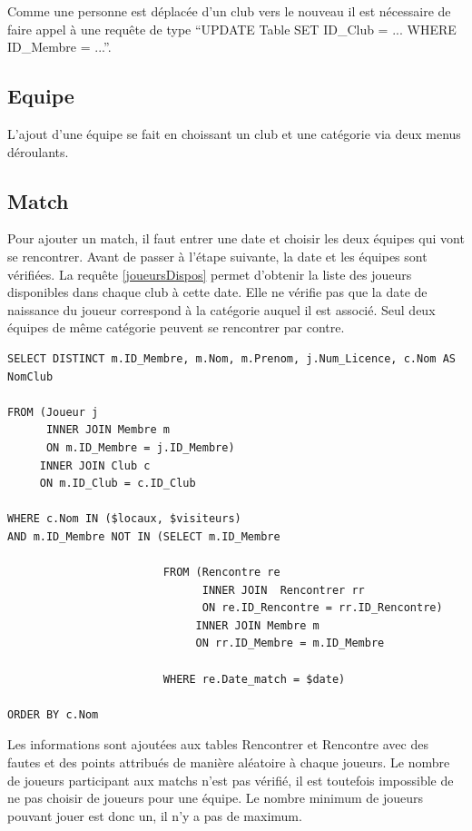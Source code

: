 \documentclass[a4paper,8pt,french,fleqn]{report}
\begin{document}
Comme une personne est déplacée d'un club vers le nouveau il est nécessaire de faire appel à une requête de type ``UPDATE Table SET ID\_Club = ... WHERE ID\_Membre = ...''.

\subsection{Equipe}
L'ajout d'une équipe se fait en choissant un club et une catégorie via deux menus déroulants.

\subsection{Match}
Pour ajouter un match, il faut entrer une date et choisir les deux équipes qui vont se rencontrer. Avant de passer à l'étape suivante, la date et les équipes sont vérifiées. La requête \ref{joueursDispos} permet d'obtenir la liste des joueurs disponibles dans chaque club à cette date. Elle ne vérifie pas que la date de naissance du joueur correspond à la catégorie auquel il est associé. Seul deux équipes de même catégorie peuvent se rencontrer par contre.

\begin{lstlisting}
SELECT DISTINCT m.ID_Membre, m.Nom, m.Prenom, j.Num_Licence, c.Nom AS NomClub 

FROM (Joueur j 
      INNER JOIN Membre m
      ON m.ID_Membre = j.ID_Membre)
     INNER JOIN Club c
     ON m.ID_Club = c.ID_Club

WHERE c.Nom IN ($locaux, $visiteurs)
AND m.ID_Membre NOT IN (SELECT m.ID_Membre

                        FROM (Rencontre re
                              INNER JOIN  Rencontrer rr
                              ON re.ID_Rencontre = rr.ID_Rencontre)
                             INNER JOIN Membre m
                             ON rr.ID_Membre = m.ID_Membre

                        WHERE re.Date_match = $date)

ORDER BY c.Nom
\end{lstlisting}  

Les informations sont ajoutées aux tables Rencontrer et Rencontre avec des fautes et des points attribués de manière aléatoire à chaque joueurs. Le nombre de joueurs participant aux matchs n'est pas vérifié, il est toutefois impossible de ne pas choisir de joueurs pour une équipe. Le nombre minimum de joueurs pouvant jouer est donc un, il n'y a pas de maximum.
\end{document}

